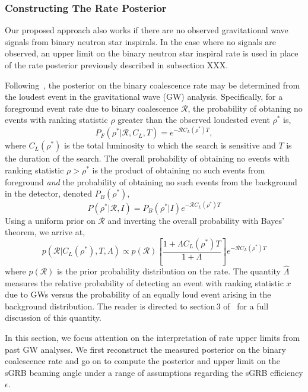 \documentclass[twocolumn,nofootinbib]{revtex4-1}
\newcommand{\cbcrate}{{{\mathcal R}}}
\newcommand{\rhostar}{{\rho^*}}
\def\gw#1{gravitational wave#1 (GW#1)\gdef\gw{GW}}
\begin{document}
\subsubsection{Constructing The Rate Posterior}

Our proposed approach also works if there are no observed 
gravitational wave signals from binary neutron star inspirals. In the 
case where no signals are observed, an upper limit on the binary
neutron star inspiral rate is used in place of the rate posterior 
previously described in subsection XXX.

Following~\cite{Biswas09,BradyFairhurst08}, the posterior on the binary
coalescence rate may be determined from the loudest event in the \gw{}
analysis.  Specifically, for a foreground event rate due to  binary coalescence
$\cbcrate$, the probability of obtaning no events with ranking statistic $\rho$
greater than the observed loudested event $\rhostar$ is,
%
\begin{equation}
P_F(\rhostar | \cbcrate, C_L, T) = e^{-\cbcrate C_L(\rhostar) T},
\end{equation}
%
where $C_L(\rhostar)$ is the total luminosity to which the search is sensitive
and $T$ is the duration of the search.  The overall probability of obtaining
no events with ranking statistic $\rho>\rhostar$ is the product of obtaining
no such events from foreground \emph{and} the probability of obtaining no such
events from the background in the detector, denoted $P_B(\rhostar)$,
%
\begin{equation}
P(\rhostar|\cbcrate,I) = P_B(\rhostar|I)e^{-\cbcrate C_L(\rhostar) T}
\end{equation}
%
Using a uniform prior on $\cbcrate$ and inverting the overall probability with
Bayes' theorem, we arrive at,
%
\begin{equation}\label{eq:loudestEventPosterior}
p(\cbcrate | C_L({\rhostar}), T, \Lambda) \propto p(\cbcrate) \left[ \frac{1+\Lambda
C_L(\rhostar) T}{1+\Lambda}\right] e^{-\cbcrate C_L(\rhostar) T}
\end{equation}
%
where $p(\cbcrate)$ is the prior probability distribution on the rate.  The
quantity $\hat{\Lambda}$ measures the relative probability of detecting an event
with ranking statistic $x$ due to \gw{s} versus the probability of an equally loud
event arising in the background distribution.  The reader is directed to
section\,3 of~\cite{BradyFairhurst08} for a full discussion of this quantity.


In this section, we focus attention on the interpretation of rate upper limits
from past \gw{} analyses.  We first reconstruct the measured posterior on the
binary coalescence rate and go on to compute the posterior and upper limit on
the sGRB beaming angle under a range of assumptions regarding the sGRB
efficiency $\epsilon$.
\end{document}
